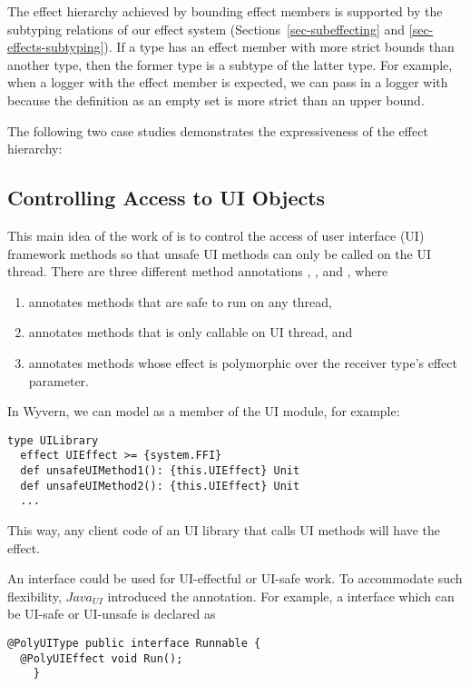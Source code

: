 The effect hierarchy achieved by bounding effect members is supported by the subtyping relations of our effect system (Sections~\ref{sec-subeffecting} and \ref{sec-effects-subtyping}). If a type has an effect member with more strict bounds than another type, then the former type is a subtype of the latter type. For example, when a logger with the effect member  is expected, we can pass in a logger with  because the definition as an empty set is more strict than an upper bound.

The following two case studies  demonstrates the expressiveness of the effect hierarchy:

\subsection{Controlling Access to UI Objects}

This main idea of the work of \cite{gordon13} is to control the access of user interface (UI) framework methods so that unsafe UI methods can only be called on the UI thread. There are three different method annotations , , and , where
\begin{enumerate}
    \item {} annotates methods that are safe to run on any thread,
    \item {} annotates methods that is only callable on UI thread, and
    \item {} annotates methods whose effect is polymorphic over the receiver type's effect parameter.
\end{enumerate}

In Wyvern, we can model  as a member of the UI module, for example:
\begin{lstlisting}[numbers=none]
type UILibrary
  effect UIEffect >= {system.FFI}
  def unsafeUIMethod1(): {this.UIEffect} Unit
  def unsafeUIMethod2(): {this.UIEffect} Unit
  ...
\end{lstlisting}
This way, any client code of an UI library that calls UI methods will have the  effect.

An interface could be used for UI-effectful or UI-safe work. To accommodate such flexibility, $\mathit{Java}_{\mathit{UI}}$ introduced the  annotation. For example, a  interface which can be UI-safe or UI-unsafe is declared as
\begin{lstlisting}[numbers=none]
@PolyUIType public interface Runnable {
  @PolyUIEffect void Run();
    }
\end{lstlisting}

